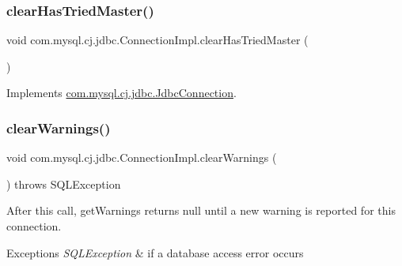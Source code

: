 \subsubsection{\texorpdfstring{clear\+Has\+Tried\+Master()}{clearHasTriedMaster()}}
{\footnotesize\ttfamily void com.\+mysql.\+cj.\+jdbc.\+Connection\+Impl.\+clear\+Has\+Tried\+Master (\begin{DoxyParamCaption}{ }\end{DoxyParamCaption})}



Implements \mbox{\hyperlink{interfacecom_1_1mysql_1_1cj_1_1jdbc_1_1_jdbc_connection_a0594dd85b684e0141c3260245cbb28e0}{com.\+mysql.\+cj.\+jdbc.\+Jdbc\+Connection}}.

\mbox{\label{classcom_1_1mysql_1_1cj_1_1jdbc_1_1_connection_impl_a5f8f37e6f8b36663bae849559cc89afa}} 
\subsubsection{\texorpdfstring{clear\+Warnings()}{clearWarnings()}}
{\footnotesize\ttfamily void com.\+mysql.\+cj.\+jdbc.\+Connection\+Impl.\+clear\+Warnings (\begin{DoxyParamCaption}{ }\end{DoxyParamCaption}) throws S\+Q\+L\+Exception}

After this call, get\+Warnings returns null until a new warning is reported for this connection.


\begin{DoxyExceptions}{Exceptions}
{\em S\+Q\+L\+Exception} & if a database access error occurs \\
\hline
\end{DoxyExceptions}
\mbox{\label{classcom_1_1mysql_1_1cj_1_1jdbc_1_1_connection_impl_a97fe5e29bb844493eb31b4f1c48d8bc7}} 
